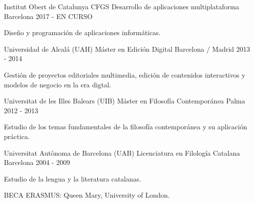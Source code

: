 

\begin{cventries}

  \cventry
    {Institut Obert de Catalunya} %
    {CFGS Desarrollo de aplicaciones multiplataforma} %
    {Barcelona} %
    {2017 - EN CURSO} %
    {
      \begin{cvitems} %
        \item {Diseño y programación de aplicaciones informáticas.}
      \end{cvitems}
    }
    
  \cventry
    {Universidad de Alcalá (UAH)} %
    {Máster en Edición Digital} %
    {Barcelona / Madrid} %
    {2013 - 2014} %
    {
      \begin{cvitems} %
        \item {Gestión de proyectos editoriales multimedia, edición de contenidos interactivos y modelos de negocio en la era digtal.}
      \end{cvitems}
    }
    
  \cventry
    {Universitat de les Illes Balears (UIB)} %
    {Máster en Filosofía Contemporánea} %
    {Palma} %
    {2012 - 2013} %
    {
      \begin{cvitems} %
        \item {Estudio de los temas fundamentales de la filosofía contemporánea y su aplicación práctica.}
      \end{cvitems}
    }
    
  \cventry
    {Universitat Autònoma de Barcelona (UAB)} %
    {Licenciatura en Filología Catalana} %
    {Barcelona} %
    {2004 - 2009} %
    {
      \begin{cvitems} %
        \item {Estudio de la lengua y la literatura catalanas.}
        \item {BECA ERASMUS: Queen Mary, University of London.}
      \end{cvitems}
    }

\end{cventries}

